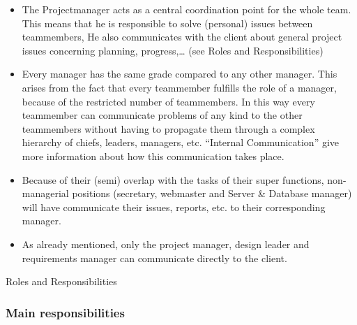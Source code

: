 \documentclass[12pt]{article}
\begin{document}
\begin{itemize}
\itemsep1pt\parskip0pt
\item
  The Projectmanager acts as a central
  coordination point for the whole team. This means that he is
  responsible to solve (personal) issues between teammembers, He also
  communicates with the client about general project issues concerning
  planning, progress,\ldots{} (see Roles and Responsibilities)
\item
  Every manager has the same grade compared to any other manager. This
  arises from the fact that every teammember fulfills the role of a
  manager, because of the restricted number of teammembers. In this way
  every teammember can communicate problems of any kind to the other
  teammembers without having to propagate them through a complex
  hierarchy of chiefs, leaders, managers, etc. ``Internal
  Communication'' give more information about how this communication
  takes place.
\item
  Because of their (semi) overlap with the tasks of their super
  functions, non-managerial positions (secretary, webmaster and Server
  \& Database manager) will have communicate their issues, reports, etc.
  to their corresponding manager.
\item
  As already mentioned, only the project manager, design leader and
  requirements manager can communicate directly to the client.
\end{itemize}

Roles and Responsibilities

\subsubsection{Main responsibilities}\label{main-responsibilities}
\end{document}
